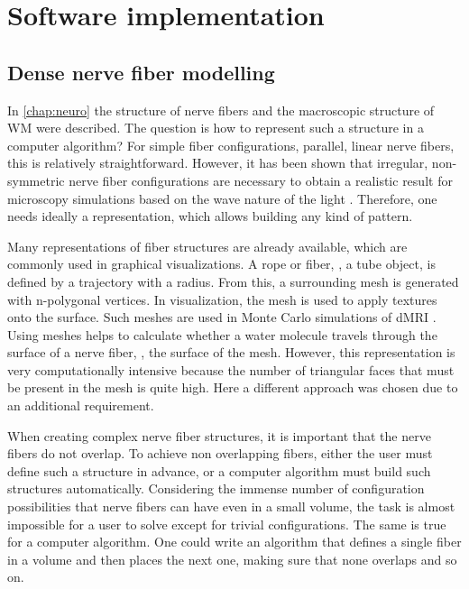 \newpage\null\thispagestyle{empty}\newpage
\clearpage{\thispagestyle{empty}\cleardoublepage}
\part{Software implementation}
\parttoc
% 
% 
% 
\setcounter{chapter}{4}
\chapter{Dense nerve fiber modelling}
\label{chap:sof:modelling}
% 
In \cref{chap:neuro} the structure of nerve fibers and the macroscopic structure of \ac{WM} were described.
The question is how to represent such a structure in a computer algorithm?
For simple fiber configurations, \eg{} parallel, linear nerve fibers, this is relatively straightforward.
However, it has been shown that irregular, non-symmetric nerve fiber configurations are necessary to obtain a realistic result for microscopy simulations based on the wave nature of the light \cite{MenzelDissertation}.
Therefore, one needs ideally a representation, which allows building any kind of pattern.
\par
%
Many representations of fiber structures are already available, which are commonly used in graphical visualizations.
A rope or fiber, \ie{}, a tube object, is defined by a trajectory with a radius.
From this, a surrounding mesh is generated with n-polygonal vertices.
In visualization, the mesh is used to apply textures onto the surface.
Such meshes are \eg{} used in Monte Carlo simulations of \ac{dMRI} \cite{Ginsburger2019,ginsburgerDis2019}.
Using meshes helps to calculate whether a water molecule travels through the surface of a nerve fiber, \ie{}, the surface of the mesh.
However, this representation is very computationally intensive because the number of triangular faces that must be present in the mesh is quite high.
Here a different approach was chosen due to an additional requirement.
\par
%
When creating complex nerve fiber structures, it is important that the nerve fibers do not overlap.
To achieve non overlapping fibers, either the user must define such a structure in advance, or a computer algorithm must build such structures automatically.
Considering the immense number of configuration possibilities that nerve fibers can have even in a small volume, the task is almost impossible for a user to solve except for trivial configurations.
The same is true for a computer algorithm.
One could write an algorithm that defines a single fiber in a volume and then places the next one, making sure that none overlaps and so on.
